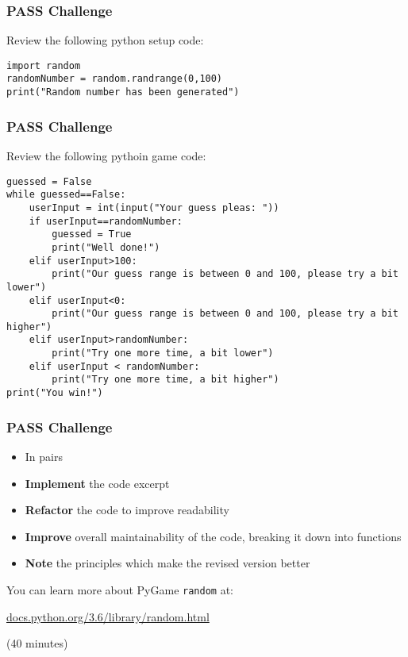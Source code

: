\begin{frame}[fragile]
	\frametitle{PASS Challenge}
		
	Review the following python setup code:

	\begin{lstlisting}
import random
randomNumber = random.randrange(0,100)
print("Random number has been generated")
 	\end{lstlisting}
		
\end{frame}

\begin{frame}[fragile]
	\frametitle{PASS Challenge}
		
	Review the following pythoin game code:

	\begin{lstlisting}
guessed = False
while guessed==False:
    userInput = int(input("Your guess pleas: "))
    if userInput==randomNumber:
        guessed = True
        print("Well done!")
    elif userInput>100:
        print("Our guess range is between 0 and 100, please try a bit lower")
    elif userInput<0:
        print("Our guess range is between 0 and 100, please try a bit higher")
    elif userInput>randomNumber:
        print("Try one more time, a bit lower")
    elif userInput < randomNumber:
        print("Try one more time, a bit higher")
print("You win!")
	\end{lstlisting}
		
\end{frame}

\begin{frame}
	\frametitle{PASS Challenge}
	
	\begin{itemize}
		\item In pairs
		\item \textbf{Implement} the code excerpt
		\item \textbf{Refactor} the code to improve readability
		\item \textbf{Improve} overall maintainability of the code, breaking it down into functions
		\item \textbf{Note} the principles which make the revised version better
	\end{itemize}
	
	You can learn more about PyGame \texttt{random} at:
	
	\vspace{1em}
	
	 \url{docs.python.org/3.6/library/random.html}
	
	\vspace{1em}
	
	(40 minutes)
	
\end{frame}